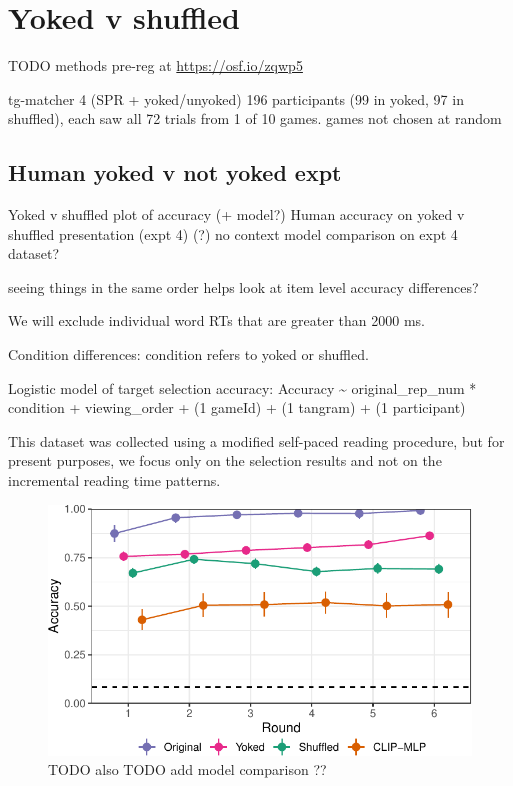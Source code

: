 \documentclass[10pt, letterpaper]{article}
\begin{document}
\section{Yoked v shuffled}\label{yoked-v-shuffled}

TODO methods pre-reg at \url{https://osf.io/zqwp5}

tg-matcher 4 (SPR + yoked/unyoked) 196 participants (99 in yoked, 97 in
shuffled), each saw all 72 trials from 1 of 10 games. games not chosen
at random

\subsection{Human yoked v not yoked
expt}\label{human-yoked-v-not-yoked-expt}

Yoked v shuffled plot of accuracy (+ model?) Human accuracy on yoked v
shuffled presentation (expt 4) (?) no context model comparison on expt 4
dataset?

seeing things in the same order helps look at item level accuracy
differences?

We will exclude individual word RTs that are greater than 2000 ms.

Condition differences: condition refers to yoked or shuffled.

Logistic model of target selection accuracy: Accuracy \textasciitilde{}
original\_rep\_num * condition + viewing\_order + (1 \textbar{} gameId)
+ (1 \textbar{} tangram) + (1 \textbar{} participant)

This dataset was collected using a modified self-paced reading
procedure, but for present purposes, we focus only on the selection
results and not on the incremental reading time patterns.

\begin{CodeChunk}
\begin{figure}[t]

{\centering \includegraphics[width=1\linewidth]{figs/fig-yoked-1} 

}

\caption[TODO also TODO add model comparison ?? \label{yoked}]{TODO also TODO add model comparison ?? \label{yoked}}\label{fig:fig-yoked}
\end{figure}
\end{CodeChunk}
\end{document}

